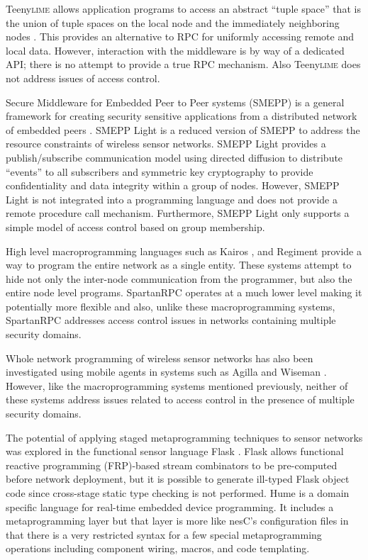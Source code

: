 Teeny\textsc{lime} allows application programs to access an abstract ``tuple space'' that is the
union of tuple spaces on the local node and the immediately neighboring nodes
\cite{Costa:2007:PWS:1516124.1516153}. This provides an alternative to RPC for uniformly
accessing remote and local data. However, interaction with the middleware is by way of a
dedicated API; there is no attempt to provide a true RPC mechanism. Also Teeny\textsc{lime} does
not address issues of access control.

Secure Middleware for Embedded Peer to Peer systems (SMEPP) is a general framework for creating
security sensitive applications from a distributed network of embedded peers
\cite{Brogi:2008:SME:1363370.1363548}. SMEPP Light \cite{Vairo:2008:SMW:1594978.1595054} is a
reduced version of SMEPP to address the resource constraints of wireless sensor networks. SMEPP
Light provides a publish/subscribe communication model using directed diffusion
\cite{intanagonwiwat-2003} to distribute ``events'' to all subscribers and symmetric key
cryptography to provide confidentiality and data integrity within a group of nodes. However,
SMEPP Light is not integrated into a programming language and does not provide a remote
procedure call mechanism. Furthermore, SMEPP Light only supports a simple model of access
control based on group membership.

High level macro\-programming languages such as Kairos \cite{springerlink:10.1007/1150259312},
and Regiment \cite{Newton:2007:RMS:1236360.1236422} provide a way to program the entire network
as a single entity. These systems attempt to hide not only the inter-node communication from the
programmer, but also the entire node level programs. SpartanRPC operates at a much lower level
making it potentially more flexible and also, unlike these macro\-programming systems,
SpartanRPC addresses access control issues in networks containing multiple security domains.

Whole network programming of wireless sensor networks has also been investigated using mobile
agents in systems such as Agilla \cite{Fok:2009:AMA:1552297.1552299} and Wiseman
\cite{Gonzalez-Valenzuela:2010:PMW:1891545.1891566}. However, like the macro\-programming
systems mentioned previously, neither of these systems address issues related to access control
in the presence of multiple security domains.


The potential of applying staged metaprogramming techniques to sensor networks was explored in
the functional sensor language Flask \cite{Mainland-Flask-2008}. Flask allows functional
reactive programming (FRP)-based stream combinators to be pre-computed before network
deployment, but it is possible to generate ill-typed Flask object code since cross-stage static
type checking is not performed. Hume \cite{Hume} is a domain specific language for real-time
embedded device programming. It includes a metaprogramming layer but that layer is more like
nesC's configuration files in that there is a very restricted syntax for a few special
metaprogramming operations including component wiring, macros, and code templating.

